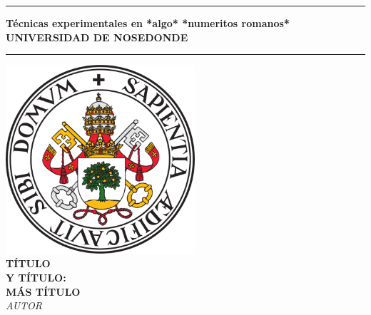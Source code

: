 \documentclass[12pt,a4paper]{article}
\begin{document}
\begin{titlepage} %
\begin{center} %
\vspace*{2\baselineskip} %
\hrule height 3pt
\vspace*{0.5\baselineskip}
{\Huge \textbf{Técnicas experimentales en *algo* *numeritos romanos*}}\\[0.1cm]
{\large \textbf{UNIVERSIDAD DE NOSEDONDE}}
\vspace*{0.5\baselineskip}
\hrule
\vspace*{6\baselineskip}
\includegraphics[width=7cm]{fotos/escudo}\\
\vspace*{4.5\baselineskip}
{\Huge \textbf{TÍTULO\\Y TÍTULO:\\[0.5cm]MÁS TÍTULO\\}}
\vfill %
\textit{AUTOR}\\
\end{center}
\end{titlepage}

\tableofcontents
\thispagestyle{empty} %
\newpage
\setcounter{page}{1} %
\end{document}
